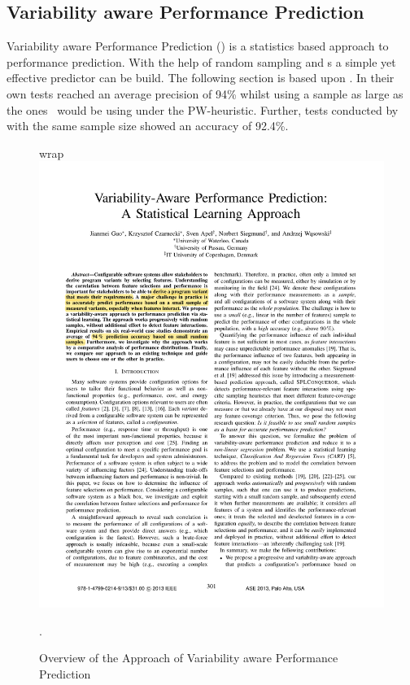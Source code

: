 \subsection{Variability aware Performance Prediction}\label{sec:VAPP}

Variability aware Performance Prediction (\VAPP) is a statistics based approach to performance prediction. With the help of random sampling and \CART s a simple yet effective predictor can be build. The following section is based upon \citet{VariabilityAwarePerformancePredictionJianmeiSigmundApel}. In their own tests \citet{VariabilityAwarePerformancePredictionJianmeiSigmundApel} reached an average precision of 94\% whilst using a sample as large as the ones \AFID~would be using under the PW-heuristic. Further, tests conducted by \citet{FasterDiscoveryofFasterSystemConfigurationsSiegmund2017} with the same sample size showed an accuracy of 92.4\%.\\
\begin{figure}wrap
	\includegraphics[page=3,clip,trim=11cm 13.5cm 1.5cm 10.25cm, width=\linewidth ]{Paper/VariabilityAwarePerformancePredictionAStatisticalLearningApproach}
	\caption{Overview of the Approach of Variability aware Performance Prediction \cite{VariabilityAwarePerformancePredictionJianmeiSigmundApel}}.
	\label{fig:VAPPOverview}
\end{figure}
